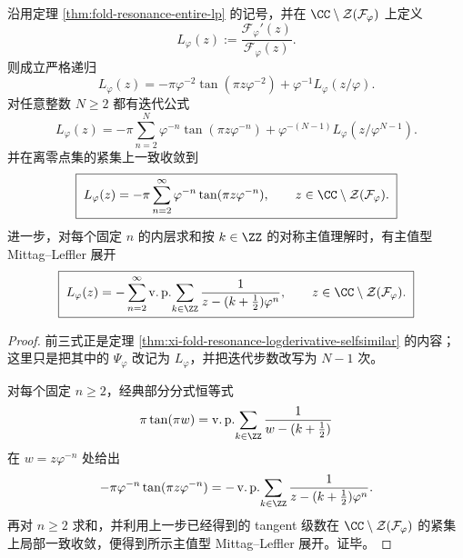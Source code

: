 \begin{theorem}\label{thm:xi-time-part59ab-resonance-logderivative-mittagleffler}
沿用定理 \ref{thm:fold-resonance-entire-lp} 的记号，并在
\(\CC\setminus\mathcal Z(\mathcal F_\varphi)\) 上定义
\[
L_\varphi(z):=\frac{\mathcal F_\varphi'(z)}{\mathcal F_\varphi(z)}.
\]
则成立严格递归
\[
\boxed{\;
L_\varphi(z)=
-\pi\varphi^{-2}\tan(\pi z\varphi^{-2})
+\varphi^{-1}L_\varphi(z/\varphi).\;}
\]
对任意整数 \(N\ge 2\) 都有迭代公式
\[
L_\varphi(z)=
-\pi\sum_{n=2}^{N}\varphi^{-n}\tan(\pi z\varphi^{-n})
+\varphi^{-(N-1)}L_\varphi(z/\varphi^{N-1}).
\]
并在离零点集的紧集上一致收敛到
\[
\boxed{\;
L_\varphi(z)=
-\pi\sum_{n=2}^{\infty}\varphi^{-n}\tan(\pi z\varphi^{-n}),
\qquad
z\in\CC\setminus\mathcal Z(\mathcal F_\varphi).\;}
\]
进一步，对每个固定 \(n\) 的内层求和按 \(k\in\ZZ\) 的对称主值理解时，有主值型 Mittag--Leffler 展开
\[
\boxed{\;
L_\varphi(z)=
-\sum_{n=2}^{\infty}
\operatorname{v.p.}\!\sum_{k\in\ZZ}
\frac{1}{z-(k+\tfrac12)\varphi^n},
\qquad
z\in\CC\setminus\mathcal Z(\mathcal F_\varphi).\;}
\]
\end{theorem}
\begin{proof}
前三式正是定理 \ref{thm:xi-fold-resonance-logderivative-selfsimilar} 的内容；这里只是把其中的 \(\Psi_\varphi\) 改记为 \(L_\varphi\)，并把迭代步数改写为 \(N-1\) 次。

对每个固定 \(n\ge 2\)，经典部分分式恒等式
\[
\pi\tan(\pi w)=\operatorname{v.p.}\!\sum_{k\in\ZZ}\frac{1}{w-(k+\tfrac12)}
\]
在 \(w=z\varphi^{-n}\) 处给出
\[
-\pi\varphi^{-n}\tan(\pi z\varphi^{-n})
=
-\operatorname{v.p.}\!\sum_{k\in\ZZ}
\frac{1}{z-(k+\tfrac12)\varphi^n}.
\]
再对 \(n\ge 2\) 求和，并利用上一步已经得到的 tangent 级数在
\(\CC\setminus\mathcal Z(\mathcal F_\varphi)\) 的紧集上局部一致收敛，便得到所示主值型 Mittag--Leffler 展开。证毕。
\end{proof}

